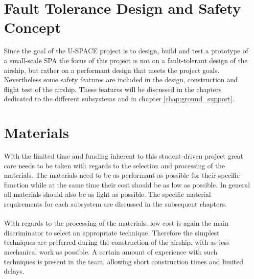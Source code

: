 \section{Fault Tolerance Design and Safety Concept}

Since the goal of the \ac{U-SPACE} project is to design, build and test a prototype of a small-scale \ac{SPA} the focus of this project is not on a fault-tolerant design of the airship, but rather on a performant design that meets the project goals. Nevertheless some safety features are included in the design, construction and flight test of the airship. These features will be discussed in the chapters dedicated to the different subsystems and in chapter \ref{chap:ground_support}.

\section{Materials}

With the limited time and funding inherent to this student-driven project great care needs to be taken with regards to the selection and processing of the materials. The materials need to be as performant as possible for their specific function while at the same time their cost should be as low as possible. In general all materials should also be as light as possible. The specific material requirements for each subsystem are discussed in the subsequent chapters.
\\
\\
With regards to the processing of the materials, low cost is again the main discriminator to select an appropriate technique. Therefore the simplest techniques are preferred during the construction of the airship, with as less mechanical work as possible. A certain amount of experience with such techniques is present in the team, allowing short construction times and limited delays.